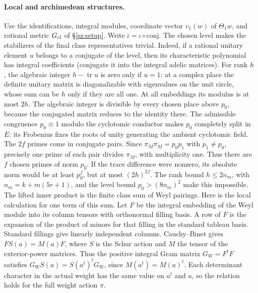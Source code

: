 \paragraph{Local and archimedean structures.}
Use the identifications, integral modules, coordinate vector $v_1(w)$ of $\Theta_1w$, and rational metric $G_{\rm cl}$ of \S\ref{sz:setup}. Write
$\bar\iota=\iota\circ\mathrm{conj}$. The chosen
level makes the stabilizers of the final class representatives trivial.
Indeed, if a rational unitary element $u$ belongs to a conjugate of
the level, then its characteristic polynomial has integral
coefficients (conjugate it into the integral adelic matrices).
For rank $h$, the algebraic integer $h-\operatorname{tr}u$ is
zero only if $u=1$: at a complex place the definite unitary matrix
is diagonalizable with eigenvalues on the unit circle, whose sum
can be $h$ only if they are all one. At all embeddings its modulus
is at most $2h$. The algebraic integer is divisible by every chosen place
above $p_0$, because the conjugated matrix reduces to the identity
there. The admissible congruence $p_0\equiv1$ modulo the cyclotomic conductor
makes $p_0$ completely split in $E$: its Frobenius fixes the roots
of unity generating the ambient cyclotomic field. The $2f$ primes
come in conjugate pairs. Since
$\pi_M\overline{\pi_M}=p_0p_1$ with $p_1\ne p_0$, precisely
one prime of each pair divides $\pi_M$, with multiplicity one.
Thus there are $f$ chosen primes of norm $p_0$. If the trace
difference were nonzero,
its absolute norm would be at least $p_0^f$, but at most
$(2h)^{2f}$. The rank bound $h\le2n_m$, with $n_m=k+m(5r+1)$, and
the level bound $p_0>(8n_m)^2$ make this impossible. The lifted inner product is the finite class sum of Weyl pairings.
Here is the local calculation for one term of this sum.
Let $F$ be the integral embedding of the Weyl module into its
column tensors with orthonormal filling basis. A row of $F$ is the
expansion of the product of minors for that filling in the standard
tableau basis. Standard fillings give linearly independent columns.
Cauchy--Binet gives $F S(a)=M(a)F$, where $S$ is the Schur action
and $M$ the tensor of the exterior-power matrices. Thus the positive
integral Gram matrix $G_W=F^tF$ satisfies
$G_WS(a)=S(a^t)^tG_W$, since $M(a^t)=M(a)^t$. Each determinant
character in the actual weight has the same value on $a^t$ and $a$,
so the relation holds for the full weight action $\pi$.


